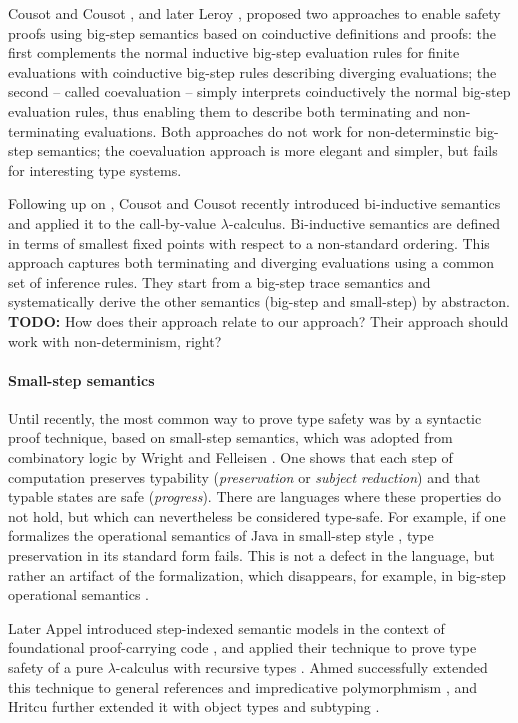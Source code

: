 \documentclass[a4paper,draft,preprint,sort&compress]{elsarticle}
\begin{document}
Cousot and Cousot \cite{CousotCousot92}, and later Leroy \ETAL \cite{LeroyGrall09},
proposed two approaches to enable safety proofs using big-step semantics based on
coinductive definitions and proofs: the first complements the normal inductive big-step
evaluation rules for finite evaluations with coinductive big-step rules describing diverging
evaluations; the second -- called coevaluation -- simply interprets coinductively the normal
big-step evaluation rules, thus enabling them to describe both terminating and non-terminating
evaluations.
Both approaches do not work for non-determinstic big-step semantics; the
coevaluation approach is more elegant and simpler, but fails for interesting type systems.

Following up on \cite{CousotCousot92}, Cousot and Cousot recently introduced bi-inductive
semantics \cite{CousotCousot07} and applied it to the call-by-value $\lambda$-calculus.
Bi-inductive semantics are defined in terms of smallest fixed points with respect to a
non-standard ordering. This approach captures both terminating and diverging evaluations
using a common set of inference rules. They start from a big-step trace semantics and
systematically derive the other semantics (big-step and small-step) by abstracton.
\textbf{TODO:} How does their approach relate to our approach? Their approach should
work with non-determinism, right?


\paragraph{Small-step semantics}

Until recently, the most common way to prove type safety was by a syntactic proof
technique, based on small-step semantics, which was adopted from combinatory
logic by Wright and Felleisen \cite{WrightFelleisen94}. One shows that each step of
computation preserves typability (\emph{preservation} or \emph{subject reduction})
and that typable states are safe (\emph{progress}). There are
languages where these properties do not hold, but which can nevertheless be
considered type-safe. For example, if one formalizes the operational semantics
of Java in small-step style \cite{FlattKrishnamurthiFelleisen98,IgarashiPierceWadler01},
type preservation in its standard form fails. This is
not a defect in the language, but rather an artifact of the formalization, which
disappears, for example, in big-step operational semantics \cite{Pierce02}.

Later Appel \ETAL introduced step-indexed semantic models in the context of
foundational proof-carrying code \cite{AppelFelty00}, and applied their technique
to prove type safety of a pure $\lambda$-calculus with recursive types
\cite{AppelMcAllester01}. Ahmed \ETAL successfully extended this technique to
general references and impredicative polymorphmism \cite{AhmedAppelVirga02,Ahmed04},
and Hritcu \ETAL further extended it with object types and subtyping
\cite{Hritcu07,HritcuSchwinghammer09}.
\end{document}
